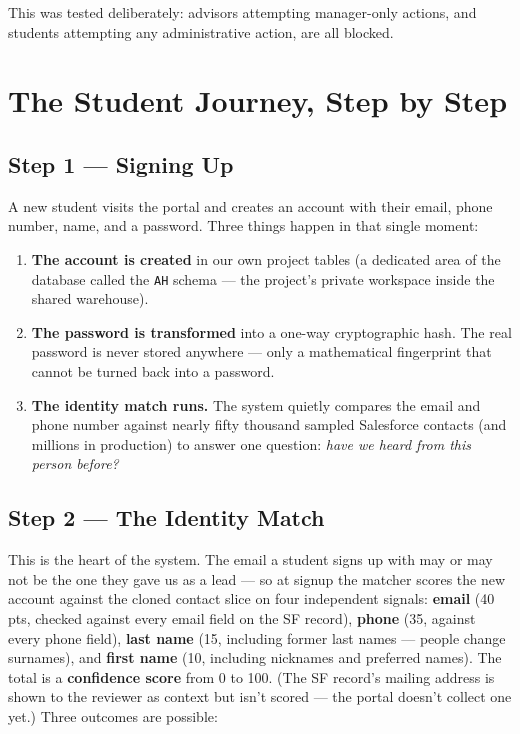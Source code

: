 \documentclass[11pt,letterpaper]{report}
\begin{document}
This was tested deliberately: advisors attempting manager-only actions, and
students attempting any administrative action, are all blocked.

\chapter{The Student Journey, Step by Step}

\section{Step 1 --- Signing Up}

A new student visits the portal and creates an account with their email, phone
number, name, and a password. Three things happen in that single moment:

\begin{enumerate}[leftmargin=1.6em]
  \item \textbf{The account is created} in our own project tables (a dedicated
        area of the database called the \texttt{AH} schema --- the project's
        private workspace inside the shared warehouse).
  \item \textbf{The password is transformed} into a one-way cryptographic hash.
        The real password is never stored anywhere --- only a mathematical
        fingerprint that cannot be turned back into a password.
  \item \textbf{The identity match runs.} The system quietly compares the email
        and phone number against nearly fifty thousand sampled Salesforce
        contacts (and millions in production) to answer one question:
        \emph{have we heard from this person before?}
\end{enumerate}

\section{Step 2 --- The Identity Match}

This is the heart of the system. The email a student signs up with may or may
not be the one they gave us as a lead --- so at signup the matcher scores the
new account against the cloned contact slice on four independent signals:
\textbf{email} (40 pts, checked against every email field on the SF record),
\textbf{phone} (35, against every phone field), \textbf{last name} (15,
including former last names --- people change surnames), and \textbf{first
name} (10, including nicknames and preferred names). The total is a
\textbf{confidence score} from 0 to 100. (The SF record's mailing address is
shown to the reviewer as context but isn't scored --- the portal doesn't
collect one yet.) Three outcomes are possible:
\end{document}
